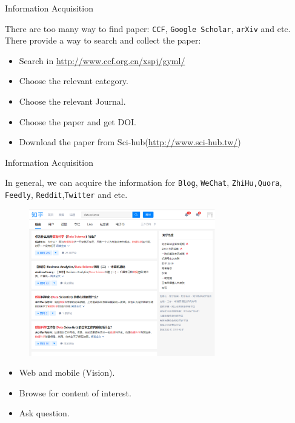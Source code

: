 \documentclass[
 size=14pt,
 paper=smartboard,  %
 mode=present, 		%
 display=slides, 	%
 style=tuliplab,  	%
 pauseslide,
 fleqn,leqno]{powerdot}{}
\begin{document}
\begin{slide}{Information Acquisition}

There are too many way to find paper: \texttt{CCF}, \texttt{Google Scholar}, \texttt{arXiv} and etc.\\
There provide a way to search and collect the paper:
\begin{itemize}
  \item Search in \url{http://www.ccf.org.cn/xspj/gyml/}
  \item Choose the relevant category.
  \item Choose the relevant Journal.
  \item Choose the paper and get DOI.
  \item Download the paper from Sci-hub(\url{http://www.sci-hub.tw/})
\end{itemize}


\end{slide}

\begin{slide}[toc=,bm=]{Information Acquisition}

In general, we can acquire the information for \texttt{Blog}, \texttt{WeChat}, \texttt{ZhiHu,Quora}, 
\texttt{Feedly}, \texttt{Reddit},\texttt{Twitter} and etc.

\begin{figure}
  \centering
  \includegraphics[width=3.2in]{figures/zhihu.eps}\\
\end{figure}

\begin{itemize}
  \item Web and mobile (Vision).
  \item Browse for content of interest.
  \item Ask question.
\end{itemize}

\end{slide}
\end{document}
